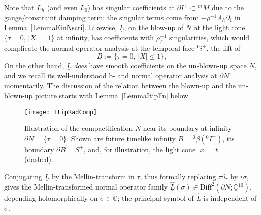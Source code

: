 \documentclass[reqno,11pt,letterpaper]{amsart}
\numberwithin{equation}{section}
\numberwithin{figure}{section}
\theoremstyle{definition}
\theoremstyle{remark}
\newcommand{\C}{\mathbb{C}}
\newcommand{\pa}{\partial}
\newcommand{\ul}[1]{\underline{#1}{}}
\newcommand{\wh}{\widehat}
\newcommand{\Diff}{\mathrm{Diff}}
\begin{document}
Note that $L_h$ (and even $L_0$) has singular coefficients at $\pa I^+\subset{}^m\!M$ due to the gauge/con\-straint damping term: the singular terms come from $-\rho^{-1}A_h\pa_1$ in Lemma~\ref{LemmaEinNscri}. Likewise, $\ul L$, on the blow-up of $N$ at the light cone $\{\tau=0,\,|X|=1\}$ at infinity, has coefficients with $\rho_I^{-1}$ singularities, which would complicate the normal operator analysis at the temporal face ${}^0i^+$, the lift of
\[
  B:=\{\tau=0,\,|X|\leq 1\},
\]
On the other hand, $\ul L$ \emph{does} have smooth coefficients on the un-blown-up space $N$, and we recall its well-understood b- and normal operator analysis at $\pa N$ momentarily. The discussion of the relation between the blown-up and the un-blown-up picture starts with Lemma~\ref{LemmaItipFn} below.

\begin{figure}[!ht]
\texttt{[image: ItipRadComp]}
\caption{Illustration of the compactification $N$ near its boundary at infinity $\pa N=\{\tau=0\}$. Shown are future timelike infinity $B={}^0\beta({}^0 I^+)$, its boundary $\pa B=S^+$, and, for illustration, the light cone $|x|=t$ (dashed).}
\label{FigItipRadComp}
\end{figure}

Conjugating $\ul L$ by the Mellin-transform in $\tau$, thus formally replacing $\tau\pa_\tau$ by $i\sigma$, gives the Mellin-transformed normal operator family $\wh{\ul L}(\sigma)\in\Diff^2(\pa N;\ul\C^{10})$, depending holomorphically on $\sigma\in\C$; the principal symbol of $\wh{\ul L}$ is independent of $\sigma$.
\end{document}
